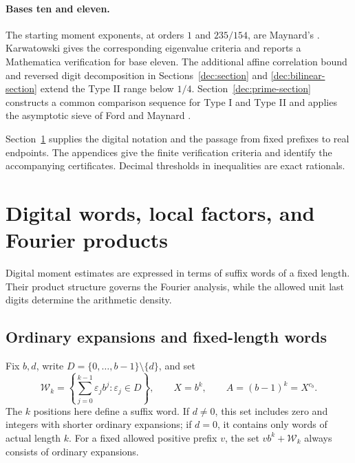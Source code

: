 \documentclass[11pt,a4paper]{article}
\theoremstyle{paperplain}
\numberwithin{equation}{section}
\begin{document}
\paragraph{Bases ten and eleven.}
The starting moment exponents, at orders $1$ and $235/154$, are
Maynard's \cite[Lemmas~10.3--10.4]{Maynard2019}. Karwatowski
\cite[Sections~3 and~5]{Karwatowski2022} gives the corresponding
eigenvalue criteria and reports a Mathematica verification for base
eleven. The additional affine correlation bound and reversed digit
decomposition in Sections~\ref{dec:section} and
\ref{dec:bilinear-section} extend the Type II range below $1/4$.
Section~\ref{dec:prime-section} constructs a common comparison
sequence for Type I and Type II and applies the asymptotic sieve of
Ford and Maynard \cite[Theorem~2.2(a)]{FordMaynard2024}.

Section~\ref{sec:preliminaries} supplies the digital notation and
the passage from fixed prefixes to real endpoints. The appendices
give the finite verification criteria and identify the accompanying
certificates. Decimal thresholds in inequalities are exact rationals.

\section{Digital words, local factors, and Fourier products}
\label{sec:preliminaries}

Digital moment estimates are expressed in terms of suffix words of a fixed
length. Their product structure governs the Fourier analysis, while the
allowed unit last digits determine the arithmetic density.

\subsection{Ordinary expansions and fixed-length words}

Fix $b,d$, write $D=\{0,\ldots,b-1\}\setminus\{d\}$, and set
\[
 \mathcal W_k=\left\{\sum_{j=0}^{k-1}\varepsilon_jb^j:
                 \varepsilon_j\in D\right\},\qquad X=b^k,
 \qquad A=(b-1)^k=X^{c_b}.
\]
The $k$ positions here define a suffix word. If $d\ne0$, this set includes
zero and integers with shorter ordinary expansions; if $d=0$, it contains
only words of actual length $k$. For a fixed allowed positive prefix $v$,
the set $v b^k+\mathcal W_k$ always consists of ordinary expansions.
\end{document}
